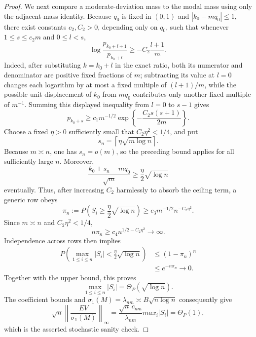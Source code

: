 \documentclass{article}
\begin{document}
\begin{proof}
We next compare a moderate-deviation mass to the modal mass using only the adjacent-mass identity.  Because \(q_0\) is fixed in \((0,1)\) and \(|k_0-mq_0|\le1\), there exist constants \(c_2,C_2>0\), depending only on \(q_0\), such that whenever \(1\le s\le c_2m\) and \(0\le l<s\),
\[
 \log\frac{p_{k_0+l+1}}{p_{k_0+l}}
 \ge-C_2\frac{l+1}{m}.
\]
Indeed, after substituting \(k=k_0+l\) in the exact ratio, both its numerator and denominator are positive fixed fractions of \(m\); subtracting its value at \(l=0\) changes each logarithm by at most a fixed multiple of \((l+1)/m\), while the possible unit displacement of \(k_0\) from \(mq_0\) contributes only another fixed multiple of \(m^{-1}\).  Summing this displayed inequality from \(l=0\) to \(s-1\) gives
\[
 p_{k_0+s}
 \ge c_1m^{-1/2}
 \exp\!\left\{-\frac{C_2s(s+1)}{2m}\right\}.
\]
Choose a fixed \(\eta>0\) sufficiently small that \(C_2\eta^2<1/4\), and put
\[
 s_n=\left\lceil\eta\sqrt{m\log n}\right\rceil.
\]
Because \(m\asymp n\), one has \(s_n=o(m)\), so the preceding bound applies for all sufficiently large \(n\).  Moreover,
\[
 \frac{k_0+s_n-mq_0}{\sqrt m}
 \ge\frac{\eta}{2}\sqrt{\log n}
\]
eventually.  Thus, after increasing \(C_2\) harmlessly to absorb the ceiling term, a generic row obeys
\[
 \pi_n
 :=P\!\left(S_i\ge\frac{\eta}{2}\sqrt{\log n}\right)
 \ge c_3m^{-1/2}n^{-C_2\eta^2}.
\]
Since \(m\asymp n\) and \(C_2\eta^2<1/4\),
\[
 n\pi_n\ge c_4 n^{1/2-C_2\eta^2}\longrightarrow\infty.
\]
Independence across rows then implies
\[
 \begin{aligned}
 P\!\left(\max_{1\le i\le n}|S_i|
 <\frac{\eta}{2}\sqrt{\log n}\right)
 &\le(1-\pi_n)^n\\
 &\le e^{-n\pi_n}\longrightarrow0.
 \end{aligned}
\]
Together with the upper bound, this proves
\[
 \max_{1\le i\le n}|S_i|=\Theta_P(\sqrt{\log n}).
\]
The coefficient bounds and \(\sigma_1(M)=\lambda_{nm}\asymp B\sqrt{n\log n}\) consequently give
\[
 \sqrt n\left\lVert\frac{EV}{\sigma_1(M)}\right\rVert_\infty
 =\frac{\sqrt n\,c_{nm}}{\lambda_{nm}}max_i|S_i|
 =\Theta_P(1),
\]
which is the asserted stochastic sanity check.


\end{proof}
\end{document}

